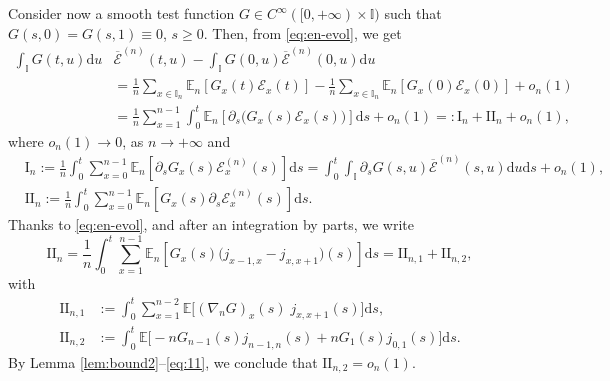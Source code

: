 \documentclass[EJP]{ejpecp} %
\newcommand\E{{\mathbb E}}
\newcommand\T{{\mathbb I}}
\renewcommand{\ge}{\geqslant}
\newcommand{\dd  }{\mathrm{d}}
\renewcommand{\bar}{\overline}
\numberwithin{equation}{section}
\begin{document}
 






 Consider now a smooth test function $G\in C^\infty([0,+\infty)\times
\T)$  such that $G(s,0) = G(s,1) \equiv 0$, $s\ge0$.
Then,  from \eqref{eq:en-evol}, we get 
\begin{align*}
  \int_{\T} G (t,u)\dd u& \bar{\mathcal E}^{(n)}(t,u)   - \int_{\T} G (0,u)
   \bar{\mathcal E}^{(n)} (0,u) \dd u\\
&
=\frac{1}{n}
   \sum_{x\in\T_n} \mathbb E_n\left[  G_x (t) \mathcal E_x(t) \right]- \frac{1}{n}
  \sum_{x\in\T_n} \mathbb E_n\left[  G_x (0) \mathcal E_x(0) \right]
   +o_n(1)\\
&  =    \frac{1}{n} \sum_{x=1}^{n-1}
 \int_0^{t} \mathbb E_n\left[ \partial_s\big(G_x (s){\mathcal
  E}_x(s)\big) \right] \dd s +o_n(1)
=:\mathrm{I}_n+\mathrm{II}_n+o_n(1),
\end{align*}
where $o_n(1)\to0$, as $n\to+\infty$ and 
\begin{align*}
&
\mathrm{I}_n:=\frac{1}{n} \int_0^{t}  
   \sum_{x=0}^{n-1} \E_n\left[  \partial_sG_x (s) \mathcal E_x ^{(n)} (s)
      \right] \dd s=\int_0^{t}\int_{\T} \partial_s G (s,u) \bar{\mathcal E}^{(n)} (s,u) \dd u \dd s +o_n(1),\\
&
  \mathrm{II}_n:=\frac{1}{n} \int_0^{t} 
  \sum_{x=0}^{n-1}   \E_n\left[ G_x (s) \partial_s\mathcal E_x ^{(n)} (s)
      \right] \dd s .
\end{align*}
Thanks to \eqref{eq:en-evol}, and after an integration by parts, we write
 \begin{equation}
\label{eq:cal0}
\mathrm{II}_n = \frac{1}{n} \int_0^{t} \sum_{x=1}^{n-1} \E_n\left[  G_x (s) 
      \big(j_{x-1,x}- j_{x,x+1}\big) (s)\right]  \dd s = \mathrm{II}_{n,1} + \mathrm{II}_{n,2},\end{equation}
      with \begin{align*}
\mathrm{II}_{n,1} &:= \int_0^{t} \sum_{x=1}^{n-2} \mathbb E\big[
       (\nabla_n G)_x(s)\; j_{x,x+1}(s) \big]  \dd s,\\
\mathrm{II}_{n,2} &:=\int_0^{t}  \mathbb E\big[- nG_{n-1}(s) j_{n-1,n}(s)
      + nG_1(s) j_{0,1}(s) \big]\dd s.
              \end{align*}
By Lemma \ref{lem:bound2}--\eqref{eq:11}, we conclude that $\mathrm{II}_{n,2}=o_n(1)$.
\end{document}
